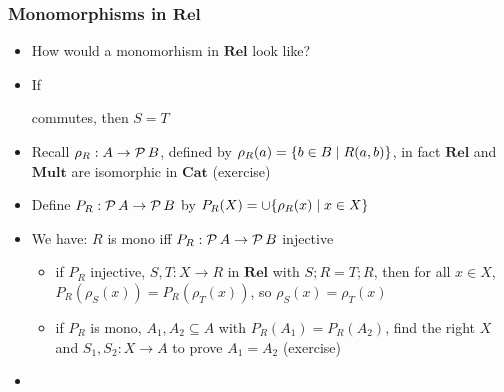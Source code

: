 \documentclass[handout]{beamer}
\newcommand{\bfsf}[1]{{\boldsymbol{#1}}}
\newcommand{\Rel}{\bfsf{Rel}}
\newcommand{\Mult}{\bfsf{Mult}}
\newcommand{\Cat}{\bfsf{Cat}}
\begin{document}
\frame
  {   
    \frametitle{Monomorphisms in $\Rel$}\label{Ch4:MonosRel}

 \begin{itemize}[<+->]
\item How would a monomorhism in $\Rel$ look like?
\item 
If
commutes, then $S=T$
\item Recall  $\rho_R : A\to \operatorname{\mathcal{P}}{B}$, 
defined by $\rho_R(a) = \{b\in B\mid R(a,b)\}$,
in fact $\Rel$ and $\Mult$ are isomorphic in $\Cat$ (exercise)
\item Define $P_R : \operatorname{\mathcal{P}}{A}\to \operatorname{\mathcal{P}}{B}$ by $P_R(X) = \cup\{\rho_R(x) \mid x\in X\}$
\item We have: $R$ is mono iff  $P_R : \operatorname{\mathcal{P}}{A}\to \operatorname{\mathcal{P}}{B}$ injective
 \begin{itemize}
    \item if $P_R$ injective, $S,T: X\to R$ in $\Rel$ with $S;R = T;R$, 
then for all $x\in X$, $P_R(\rho_S(x)) = P_R(\rho_T(x))$, so $\rho_S(x) = \rho_T(x)$ %
    \item if $P_R$ is mono, $A_1,A_2\subseteq A$ with $P_R(A_1)=P_R(A_2)$,
find the right $X$ and $S_1,S_2: X\to A$ to prove $A_1=A_2$ (exercise)
\end{itemize}
\item 
 \end{itemize}

 }
\end{document}
